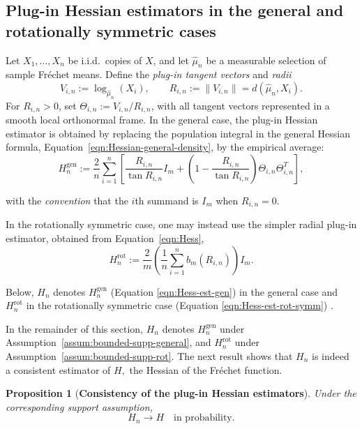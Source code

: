 \documentclass{amsart}
\newtheorem{proposition}[theorem]{Proposition}
\theoremstyle{definition}
\theoremstyle{remark}
\newcommand\0{\boldsymbol{0}}
\begin{document}
\subsection{Plug-in Hessian estimators in the general and rotationally symmetric cases}

\noindent
Let $X_1,\dots,X_n$ be i.i.d.\ copies of $X$, and let $\hat\mu_n$ be a measurable selection of sample Fréchet means. Define the \textit{plug-in tangent vectors} and \textit{radii}
\[
V_{i,n}:=\log_{\hat\mu_n}(X_i),
\qquad
R_{i,n}:=\|V_{i,n}\|=d(\hat\mu_n,X_i).
\]
For $R_{i,n}>0$, set $\Theta_{i,n}:=V_{i,n}/R_{i,n}$, with all tangent vectors represented in a smooth local orthonormal frame. In the general case, the plug-in Hessian estimator is obtained by replacing the population integral in the general Hessian formula, Equation~\eqref{eqn:Hessian-general-density}, by the empirical average:
\begin{equation}\label{eqn:Hess-est-gen}
\boxed{    H_n^{\mathrm{gen}}
:=
\frac{2}{n}\sum_{i=1}^n
\left[
\frac{R_{i,n}}{\tan R_{i,n}}I_m+
\left(1-\frac{R_{i,n}}{\tan R_{i,n}}\right)
\Theta_{i,n}\Theta_{i,n}^{T}
\right],}
\end{equation}


with the \textit{convention} that the $i$th summand is $I_m$ when $R_{i,n}=0$.

In the rotationally symmetric case, one may instead use the simpler radial plug-in estimator, obtained from Equation~\eqref{eqn:Hess},
\begin{equation}\label{eqn:Hess-est-rot-symm}
\boxed{    H_n^{\mathrm{rot}}
:=
\frac{2}{m}
\left(
\frac1n\sum_{i=1}^n b_m(R_{i,n})
\right)I_m.}
\end{equation}

Below, $H_n$ denotes $H_n^{\mathrm{gen}}$ (Equation \eqref{eqn:Hess-est-gen}) in the general case and $H_n^{\mathrm{rot}}$ in the rotationally symmetric case (Equation \eqref{eqn:Hess-est-rot-symm}) .

In the remainder of this section, \(H_n\) denotes \(H_n^{\mathrm{gen}}\) under Assumption~\ref{assum:bounded-supp-general}, and \(H_n^{\mathrm{rot}}\) under Assumption~\ref{assum:bounded-supp-rot}. The next result shows that $H_n$ is indeed a consistent estimator of $H,$ the Hessian of the Fréchet function.

\begin{proposition}[\textbf{Consistency of the plug-in Hessian estimators}]
\label{prop:Hn_consistency}
Under the corresponding support assumption,
\[
H_n\to H \quad \text{in probability}.
\]
\end{proposition}
\end{document}
